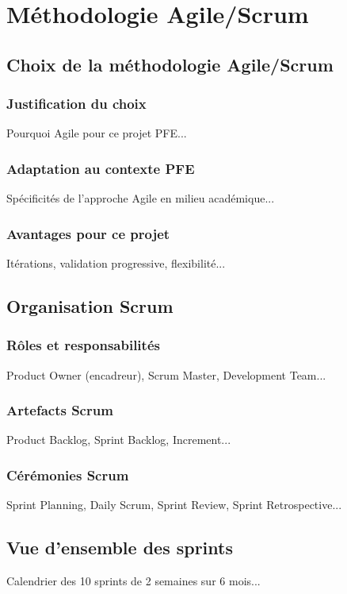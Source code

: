 \documentclass[12pt,a4paper]{report}
\begin{document}
\chapter{Méthodologie Agile/Scrum}
\label{chap:scrum}

\section{Choix de la méthodologie Agile/Scrum}
\subsection{Justification du choix}
Pourquoi Agile pour ce projet PFE...

\subsection{Adaptation au contexte PFE}
Spécificités de l'approche Agile en milieu académique...

\subsection{Avantages pour ce projet}
Itérations, validation progressive, flexibilité...

\section{Organisation Scrum}
\subsection{Rôles et responsabilités}
Product Owner (encadreur), Scrum Master, Development Team...

\subsection{Artefacts Scrum}
Product Backlog, Sprint Backlog, Increment...

\subsection{Cérémonies Scrum}
Sprint Planning, Daily Scrum, Sprint Review, Sprint Retrospective...

\section{Vue d'ensemble des sprints}
Calendrier des 10 sprints de 2 semaines sur 6 mois...
\end{document}
